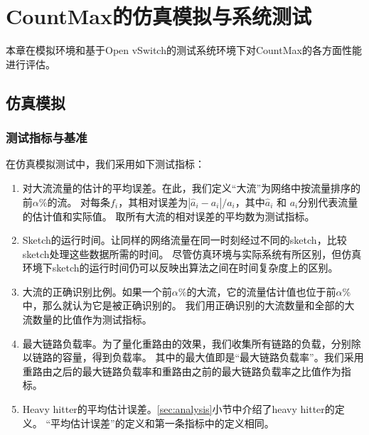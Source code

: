 \chapter{CountMax的仿真模拟与系统测试}
本章在模拟环境和基于Open vSwitch的测试系统环境下对CountMax的各方面性能进行评估。
\section{仿真模拟}\label{sec:simulation}

\subsection{测试指标与基准}\label{subsec:metric}
在仿真模拟测试中，我们采用如下测试指标：
\begin{enumerate}
	\item
    对大流流量的估计的平均误差。在此，我们定义“大流”为网络中按流量排序的前$\alpha$\%的流。
    对每条$f_i$，其相对误差为$|\hat{a}_i-a_i|/a_i$，其中$\hat{a}_i$ 和 $a_i$分别代表流量的估计值和实际值。
    取所有大流的相对误差的平均数为测试指标。
	\item
	Sketch的运行时间。让同样的网络流量在同一时刻经过不同的sketch，比较sketch处理这些数据所需的时间。
	尽管仿真环境与实际系统有所区别，但仿真环境下sketch的运行时间仍可以反映出算法之间在时间复杂度上的区别。
	\item
	大流的正确识别比例。如果一个前$\alpha$\%的大流，它的流量估计值也位于前$\alpha$\%中，那么就认为它是被正确识别的。
	我们用正确识别的大流数量和全部的大流数量的比值作为测试指标。
	\item
	最大链路负载率。为了量化重路由的效果，我们收集所有链路的负载，分别除以链路的容量，得到负载率。
	其中的最大值即是“最大链路负载率”。我们采用重路由之后的最大链路负载率和重路由之前的最大链路负载率之比值作为指标。
	\item
	Heavy hitter的平均估计误差。\ref{sec:analysis}小节中介绍了heavy hitter的定义。
	“平均估计误差”的定义和第一条指标中的定义相同。
\end{enumerate}

